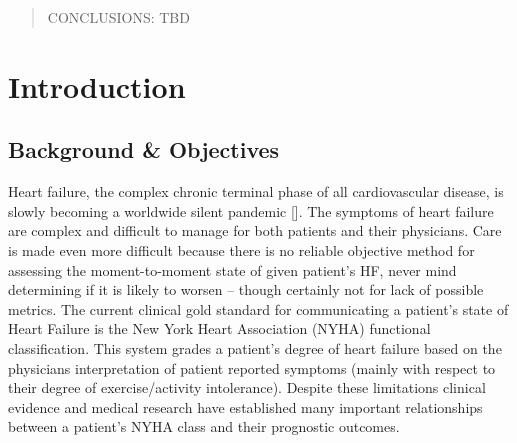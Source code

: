 \documentclass[]{article}
\begin{document}
\begin{abstract}
\noindent CONCLUSIONS: TBD %


\end{abstract}

\clearpage

\section{Introduction}
\subsection{Background \& Objectives} %

Heart failure, the complex chronic terminal phase of all cardiovascular disease, is slowly becoming a worldwide silent pandemic []. The symptoms of heart failure are complex and difficult to manage for both patients and their physicians. Care is made even more difficult because there is no reliable objective method for assessing the moment-to-moment state of given patient’s HF, never mind determining if it is likely to worsen – though certainly not for lack of possible metrics. The current clinical gold standard for communicating a patient’s state of Heart Failure is the New York Heart Association (NYHA) functional classification. This system grades a patient's degree of heart failure based on the physicians interpretation of patient reported symptoms (mainly with respect to their degree of exercise/activity intolerance). Despite these limitations clinical evidence and medical research have established many important relationships between a patient's NYHA class and their prognostic outcomes. 
\end{document}
